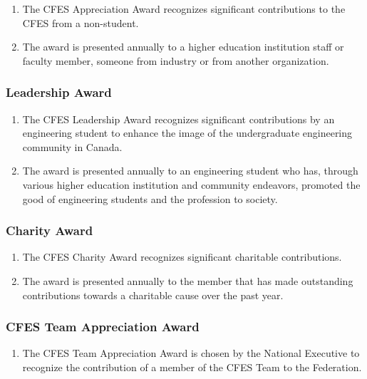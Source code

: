 \begin{enumerate}
 \item
  The CFES Appreciation Award recognizes significant contributions to the CFES from a non-student.
 \item
  The award is presented annually to a higher education institution staff or faculty member, someone from industry or from another organization.
\end{enumerate}

\subsubsection{Leadership Award}
\label{leadership-award}

\begin{enumerate}
 \item
  The CFES Leadership Award recognizes significant contributions by an engineering student to enhance the image of the undergraduate engineering community in Canada.
 \item
  The award is presented annually to an engineering student who has, through various higher education institution and community endeavors, promoted the good of engineering students and the profession to society.
\end{enumerate}

\subsubsection{Charity Award}
\label{charity-award}

\begin{enumerate}
 \item
  The CFES Charity Award recognizes significant charitable contributions.
 \item
  The award is presented annually to the member that has made outstanding contributions towards a charitable cause over the past year.
\end{enumerate}

\subsubsection{CFES Team Appreciation Award}
\label{cfes-team-appreciation-award}

\begin{enumerate}
 \item
  The CFES Team Appreciation Award is chosen by the National Executive to recognize the contribution of a member of the CFES Team to the Federation.
\end{enumerate}

